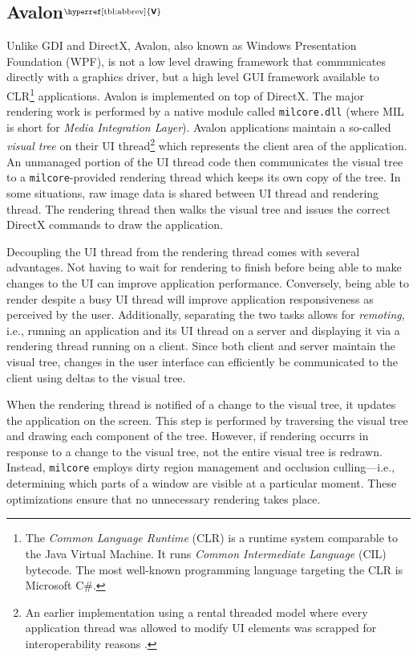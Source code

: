 \documentclass[10pt,twocolumn,a4paper]{article}
\newcommand{\bs}[1]{\textbf{\sffamily #1}}
\newcommand{\winver}[1]{$^{\text{\hyperref[tbl:abbrev]{\bs{#1}}}}$}
\newcommand{\winsubsection}[2]{\subsection[#1]{#1\winver{#2}}}
\begin{document}
		\winsubsection{Avalon}{V}\label{sec:milcore}
			Unlike GDI and DirectX, Avalon, also known as Windows Presentation
			Foundation (WPF),
			is not a low level drawing framework
			that communicates directly with a graphics driver, but a
			high level GUI framework available to CLR\footnote{The \textit{Common
			Language Runtime} (CLR) is a runtime system comparable to the Java Virtual
			Machine. It runs \textit{Common Intermediate Language} (CIL) bytecode.
			The most well-known programming language targeting the CLR is Microsoft
			C\#.} applications. Avalon is
			implemented on top of DirectX. The major rendering work is performed
			by a native module called \texttt{milcore.dll} (where MIL is short for
			\textit{Media Integration Layer}). Avalon applications maintain a
			so-called \textit{visual tree} on their UI thread\footnote{An
			earlier implementation using a rental threaded model where every
			application thread was allowed to modify UI elements was scrapped
			for interoperability reasons \cite{goingdeep}.} which represents the
			client area of the application. An unmanaged portion of the UI thread
			code then communicates the visual tree to a \texttt{milcore}-provided
			rendering thread which keeps its own copy of the tree. In some situations,
			raw image data is shared between UI thread and rendering thread. The
			rendering thread then walks the visual tree and issues the correct
			DirectX commands to draw the application.
			\cite{goingdeep,dwmwpf}

			Decoupling the UI thread from the rendering thread comes with several
			advantages. Not having to wait for rendering to finish before being
			able to make changes to the UI can improve application performance.
			Conversely, being able to render despite a busy UI thread will improve
			application responsiveness as perceived by the user. Additionally,
			separating the two tasks allows for \textit{remoting}, i.e., running
			an application and its UI thread on a server and displaying it
			via a rendering thread running on a client. Since both client and
			server maintain the visual tree, changes in the user interface can
			efficiently be communicated to the client using deltas to the visual
			tree.
			\cite{goingdeep}

			When the rendering thread is notified of a change to the visual tree,
			it updates the application on the screen. This step is performed by
			traversing the visual tree and drawing each component of the tree.
			However, if rendering occurrs in response to a change to the visual
			tree, not the entire visual tree is redrawn. Instead, \texttt{milcore}
			employs dirty region management and occlusion culling---i.e.,
			determining which parts of a window are visible at a particular
			moment. These optimizations ensure that no unnecessary rendering takes
			place.
			\cite{goingdeep}
\end{document}
